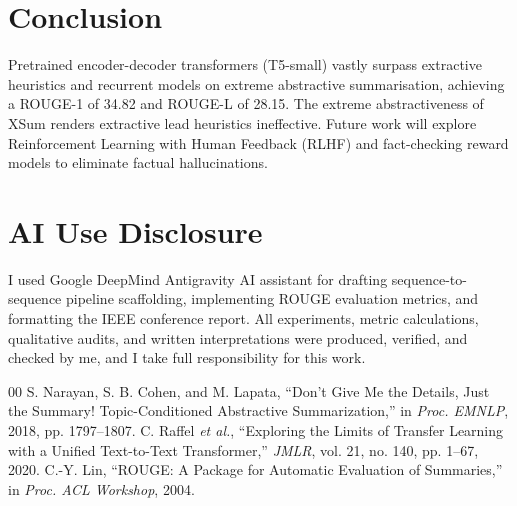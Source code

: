 \documentclass[conference]{IEEEtran}
\begin{document}
\section{Conclusion}
Pretrained encoder-decoder transformers (T5-small) vastly surpass extractive heuristics and recurrent models on extreme abstractive summarisation, achieving a ROUGE-1 of 34.82 and ROUGE-L of 28.15. The extreme abstractiveness of XSum renders extractive lead heuristics ineffective. Future work will explore Reinforcement Learning with Human Feedback (RLHF) and fact-checking reward models to eliminate factual hallucinations.

\section*{AI Use Disclosure}
I used Google DeepMind Antigravity AI assistant for drafting sequence-to-sequence pipeline scaffolding, implementing ROUGE evaluation metrics, and formatting the IEEE conference report. All experiments, metric calculations, qualitative audits, and written interpretations were produced, verified, and checked by me, and I take full responsibility for this work.

\begin{thebibliography}{00}
 S. Narayan, S. B. Cohen, and M. Lapata, ``Don't Give Me the Details, Just the Summary! Topic-Conditioned Abstractive Summarization,'' in \textit{Proc. EMNLP}, 2018, pp. 1797--1807.
 C. Raffel \textit{et al.}, ``Exploring the Limits of Transfer Learning with a Unified Text-to-Text Transformer,'' \textit{JMLR}, vol. 21, no. 140, pp. 1--67, 2020.
 C.-Y. Lin, ``ROUGE: A Package for Automatic Evaluation of Summaries,'' in \textit{Proc. ACL Workshop}, 2004.
\end{thebibliography}
\end{document}
